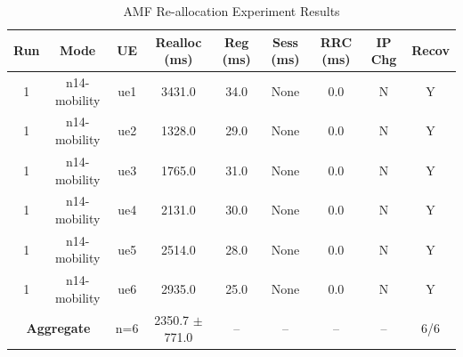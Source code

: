 \begin{table}[ht]
\centering
\begin{tabular}{|c|c|c|c|c|c|c|c|c|}
\hline
Run & Mode & UE & Realloc (ms) & Reg (ms) & Sess (ms) & RRC (ms) & IP Chg & Recov \\
\hline
1 & n14-mobility & ue1 & 3431.0 & 34.0 & None & 0.0 & N & Y \\
1 & n14-mobility & ue2 & 1328.0 & 29.0 & None & 0.0 & N & Y \\
1 & n14-mobility & ue3 & 1765.0 & 31.0 & None & 0.0 & N & Y \\
1 & n14-mobility & ue4 & 2131.0 & 30.0 & None & 0.0 & N & Y \\
1 & n14-mobility & ue5 & 2514.0 & 28.0 & None & 0.0 & N & Y \\
1 & n14-mobility & ue6 & 2935.0 & 25.0 & None & 0.0 & N & Y \\
\multicolumn{2}{|c|}{\textbf{Aggregate}} & n=6 & 2350.7 $\pm$ 771.0 & -- & -- & -- & -- & 6/6 \\
\hline
\end{tabular}
\caption{AMF Re-allocation Experiment Results}
\label{tab:amf_realloc}
\end{table}
